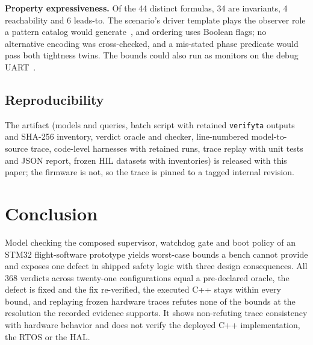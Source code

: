 \documentclass[conference,a4paper]{IEEEtran}
\newif\ifrerunmarks
\DeclareRobustCommand{\rerun}[1]{\ifrerunmarks\textcolor{red}{#1}\else#1\fi}
\newif\ifanon
\begin{document}
\textbf{Property expressiveness.} Of the 44 distinct formulas, 34 are invariants, 4 reachability and 6 leads-to. The scenario's driver template plays the observer role a pattern catalog would generate~\cite{vogel2023}, and ordering uses Boolean flags; no alternative encoding was cross-checked, and a mis-stated phase predicate would pass both tightness twins. The bounds could also run as monitors on the debug UART~\cite{zilio2023,cho2025}.

\subsection{Reproducibility}
The artifact (models and queries, batch script with retained \texttt{verifyta} outputs and SHA-256 inventory, verdict oracle and checker, line-numbered model-to-source trace, code-level harnesses with retained runs, trace replay with unit tests and JSON report, frozen HIL datasets with inventories) \ifanon is released on acceptance; the firmware is not, so the trace is pinned to a tagged internal revision and source excerpts can be supplied through the chairs.\else is released with this paper; the firmware is not, so the trace is pinned to a tagged internal revision.\fi

\section{Conclusion}
Model checking the composed supervisor, watchdog gate and boot policy of an STM32 flight-software prototype yields worst-case bounds a bench cannot provide and exposes one defect in shipped safety logic with three design consequences. \rerun{All 368 verdicts across twenty-one configurations equal a pre-declared oracle}, the defect is fixed and the fix re-verified, \rerun{the executed C++ stays within every bound, and replaying frozen hardware traces refutes none of the bounds} at the resolution the recorded evidence supports. It shows non-refuting trace consistency with hardware behavior and does not verify the deployed C++ implementation, the RTOS or the HAL.
\end{document}

